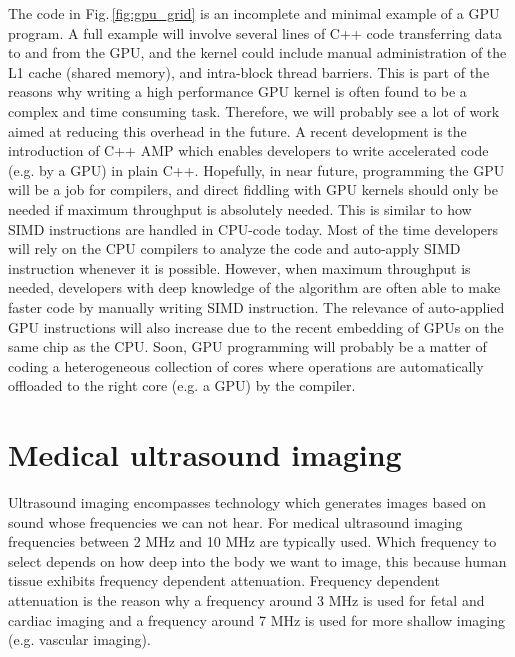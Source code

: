 The code in Fig.\,\ref{fig:gpu_grid} is an incomplete and minimal example of a GPU program. A full example will involve several lines of C++ code transferring data to and from the GPU, and the kernel could include manual administration of the L1 cache (shared memory), and intra-block thread barriers. This is part of the reasons why writing a high performance GPU kernel is often found to be a complex and time consuming task. Therefore, we will probably see a lot of work aimed at reducing this overhead in the future.  A recent development is the introduction of C++ AMP which enables developers to write accelerated code (e.g. by a GPU) in plain C++. Hopefully, in near future, programming the GPU will be a job for compilers, and direct fiddling with GPU kernels should only be needed if maximum throughput is absolutely needed. This is similar to how SIMD instructions are handled in CPU-code today. Most of the time developers will rely on the CPU compilers to analyze the code and auto-apply SIMD instruction whenever it is possible. However, when maximum throughput is needed, developers with deep knowledge of the algorithm are often able to make faster code by manually writing SIMD instruction. The relevance of auto-applied GPU instructions will also increase due to the recent embedding of GPUs on the same chip as the CPU. Soon, GPU programming will probably be a matter of coding a heterogeneous collection of cores where operations are automatically offloaded to the right core (e.g. a GPU) by the compiler.

\section {Medical ultrasound imaging}\label{sec:ultrasound}
Ultrasound imaging encompasses technology which generates images based on sound whose frequencies we can not hear. For medical ultrasound imaging frequencies between 2 MHz and 10 MHz are typically used. Which frequency to select depends on how deep into the body we want to image, this because human tissue exhibits frequency dependent attenuation. Frequency dependent attenuation is the reason why a frequency around 3 MHz is used for fetal and cardiac imaging and a frequency around 7 MHz is used for more shallow imaging (e.g. vascular imaging). 

